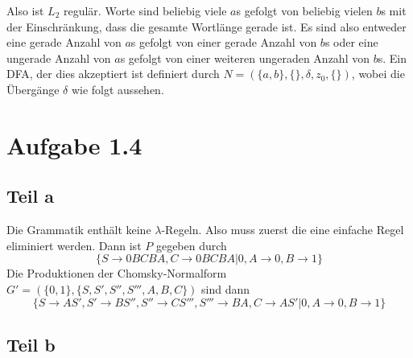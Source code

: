 \documentclass[10pt,a4paper]{article}
\begin{document}
Also ist $L_{2}$ regulär.
Worte sind beliebig viele $a$s gefolgt von beliebig vielen $b$s mit der Einschränkung, dass die gesamte Wortlänge gerade ist.
Es sind also entweder eine gerade Anzahl von $a$s gefolgt von einer gerade Anzahl von $b$s oder eine ungerade Anzahl von $a$s gefolgt von einer weiteren ungeraden Anzahl von $b$s.
Ein DFA, der dies akzeptiert ist definiert durch $N = (\{ a, b \}, \{  \}, \delta, z_{0}, \{  \})$, wobei die Übergänge $\delta$ wie folgt aussehen.
\\

\section{Aufgabe 1.4}

\subsection{Teil a}

Die Grammatik enthält keine $\lambda$-Regeln.
Also muss zuerst die eine einfache Regel eliminiert werden.
Dann ist $P$ gegeben durch
\begin{equation}
  \{ S \rightarrow 0BCBA, C \rightarrow 0BCBA | 0, A \rightarrow 0, B \rightarrow 1 \}
\end{equation}
Die Produktionen der Chomsky-Normalform $G' = (\{ 0, 1 \}, \{ S, S', S'', S''', A, B, C \})$ sind dann
\begin{equation}
  \{ S \rightarrow AS', S' \rightarrow BS'', S'' \rightarrow CS''', S''' \rightarrow BA, C \rightarrow AS' | 0, A \rightarrow 0, B \rightarrow 1 \}
\end{equation}

\subsection{Teil b}
\end{document}
